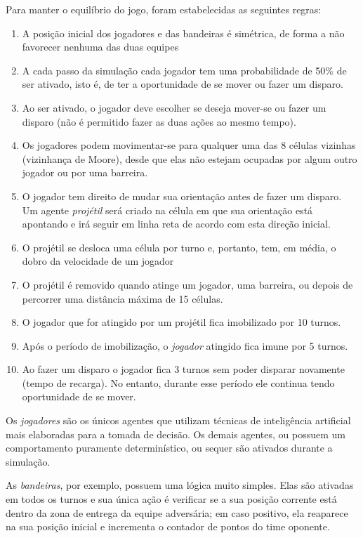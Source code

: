 \documentclass[preprint,12pt]{elsarticle}
\begin{document}
Para manter o equilíbrio do jogo, foram estabelecidas as seguintes regras:

\begin{enumerate}
	\setlength\itemsep{0em}
	\item A posição inicial dos jogadores e das bandeiras é simétrica, de forma a não favorecer nenhuma das duas equipes
	\item A cada passo da simulação cada jogador tem uma probabilidade de 50\% de ser ativado, isto é, de ter a oportunidade de se mover ou fazer um disparo.
	\item Ao ser ativado, o jogador deve escolher se deseja mover-se ou fazer um disparo (não é permitido fazer as duas ações ao mesmo tempo).
	\item Os jogadores podem movimentar-se para qualquer uma das 8 células vizinhas (vizinhança de Moore), desde que elas não estejam ocupadas por algum outro jogador ou por uma barreira.
	\item O jogador tem direito de mudar sua orientação antes de fazer um disparo. Um agente \textit{projétil} será criado na célula em que sua orientação está apontando e irá seguir em linha reta de acordo com esta direção inicial.
	\item O projétil se desloca uma célula por turno e, portanto, tem, em média, o dobro da velocidade de um jogador
	\item O projétil é removido quando atinge um jogador, uma barreira, ou depois de percorrer uma distância máxima de 15 células.	
	\item O jogador que for atingido por um projétil fica imobilizado por 10 turnos.
	\item Após o período de imobilização, o \textit{jogador} atingido fica imune por 5 turnos.
	\item Ao fazer um disparo o jogador fica 3 turnos sem poder disparar novamente (tempo de recarga). No entanto, durante esse período ele continua tendo oportunidade de se mover.
\end{enumerate}

Os \textit{jogadores} são os únicos agentes que utilizam técnicas de inteligência artificial mais elaboradas para a tomada de decisão. Os demais agentes, ou possuem um comportamento puramente determinístico, ou sequer são ativados durante a simulação. 

As \textit{bandeiras}, por exemplo, possuem uma lógica muito simples. Elas são ativadas em todos os turnos e sua única ação é verificar se a sua posição corrente está dentro da zona de entrega da equipe adversária; em caso positivo, ela reaparece na sua posição inicial e incrementa o contador de pontos do time oponente.
\end{document}
